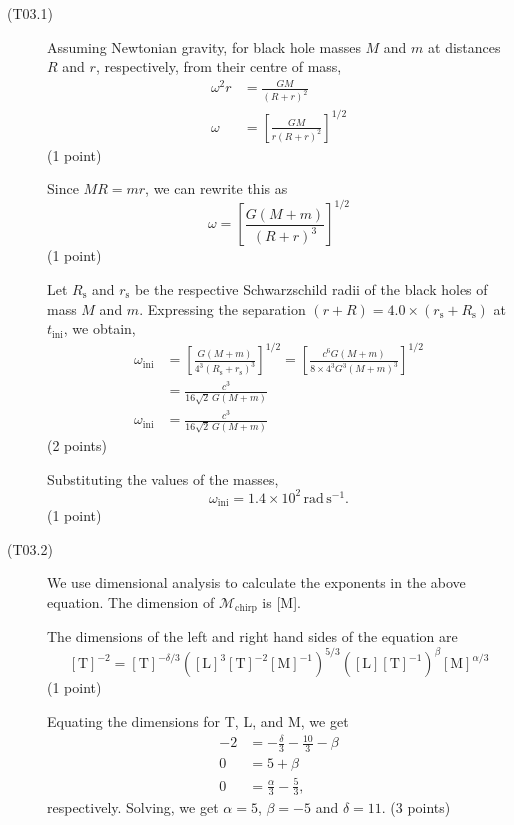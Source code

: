 \begin{description}
\item[(T03.1)] Assuming Newtonian gravity, for black hole masses $M$ and $m$
  at distances $R$ and $r$, respectively, from their centre of mass,
  \begin{align*}
    \omega^2 r &= \frac{GM}{(R+r)^2} \\
    \omega &= \left[\frac{GM}{r(R+r)^2}\right]^{1/2}
  \end{align*}
  \hfill(1 point)

  Since $MR = mr$, we can rewrite this as
  \[ \omega = \left[\frac{G(M+m)}{(R+r)^3}\right]^{1/2} \]
  \hfill(1 point)

  Let $R_{\mathrm{s}}$ and $r_{\mathrm{s}}$ be the respective Schwarzschild
  radii of the black holes of mass $M$ and $m$. Expressing the separation
  $(r+R) = 4.0 \times (r_{\mathrm{s}} + R_{\mathrm{s}})$ at
  $t_{\mathrm{ini}}$, we obtain,
  \begin{align*}
    \omega_{\mathrm{ini}}
      &= \left[\frac{G(M+m)}{4^3 (R_{\mathrm{s}}+r_{\mathrm{s}})^3}\right]^{1/2}
       = \left[\frac{c^6 G(M+m)}{8 \times 4^3 G^3 (M+m)^3}\right]^{1/2} \\
      &= \frac{c^3}{16\sqrt{2}\,G(M+m)} \\
    \omega_{\mathrm{ini}} &= \frac{c^3}{16\sqrt{2}\,G(M+m)}
  \end{align*}
  \hfill(2 points)

  Substituting the values of the masses,
  \[ \omega_{\mathrm{ini}} = 1.4 \times 10^2\,\mathrm{rad\,s^{-1}}. \]
  \hfill(1 point)

\item[(T03.2)] We use dimensional analysis to calculate the exponents in the
  above equation. The dimension of $\mathcal{M}_{\mathrm{chirp}}$ is [M].

  The dimensions of the left and right hand sides of the equation are
  \[ [\mathrm{T}]^{-2} = [\mathrm{T}]^{-\delta/3}
     \left([\mathrm{L}]^3[\mathrm{T}]^{-2}[\mathrm{M}]^{-1}\right)^{5/3}
     \left([\mathrm{L}][\mathrm{T}]^{-1}\right)^{\beta}
     [\mathrm{M}]^{\alpha/3} \]
  \hfill(1 point)

  Equating the dimensions for T, L, and M, we get
  \begin{align*}
    -2 &= -\frac{\delta}{3} - \frac{10}{3} - \beta \\
    0 &= 5 + \beta \\
    0 &= \frac{\alpha}{3} - \frac{5}{3},
  \end{align*}
  respectively. Solving, we get $\alpha = 5$, $\beta = -5$ and $\delta = 11$.
  \hfill(3 points)


\end{description}
